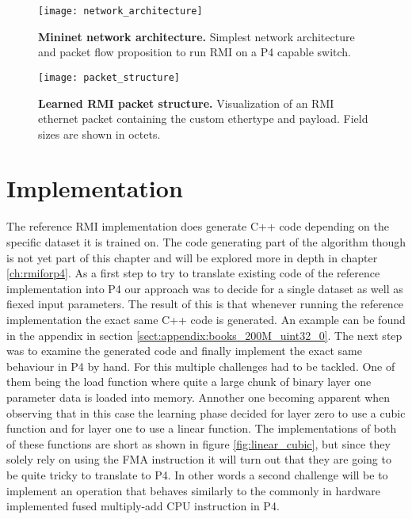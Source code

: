 \begin{figure}[!ht]
  \centering
  \texttt{[image: network\_architecture]}
  \caption[Mininet Network Architecture]{
    \textbf{Mininet network architecture.} Simplest network architecture and packet flow proposition to run RMI on a P4 capable switch.
  }
  \label{fig:network_architecture}
\end{figure}

\begin{figure}[!ht]
  \centering
  \texttt{[image: packet\_structure]}
  \caption[RMI Packet Structure]{
    \textbf{Learned RMI packet structure.} Visualization of an RMI ethernet packet containing the custom ethertype and payload. Field sizes are shown in octets.
  }
  \label{fig:packet_structure}
\end{figure}

\section{Implementation}
\label{sect:rmionbmv2:implmentation}
The reference RMI implementation \cite{cdfshop} does generate C++ code depending on the specific dataset it is trained on. The code generating part of the algorithm though is not yet part of this chapter and will be explored more in depth in chapter \ref{ch:rmiforp4}. As a first step to try to translate existing code of the reference implementation into P4 our approach was to decide for a single dataset as well as fiexed input parameters. The result of this is that whenever running the reference implementation the exact same C++ code is generated. An example can be found in the appendix in section \ref{sect:appendix:books_200M_uint32_0}. The next step was to examine the generated code and finally implement the exact same behaviour in P4 by hand. For this multiple challenges had to be tackled. One of them being the load function where quite a large chunk of binary layer one parameter data is loaded into memory. Annother one becoming apparent when observing that in this case the learning phase decided for layer zero to use a cubic function and for layer one to use a linear function. The implementations of both of these functions are short as shown in figure \ref{fig:linear_cubic}, but since they solely rely on using the FMA instruction it will turn out that they are going to be quite tricky to translate to P4. In other words a second challenge will be to implement an operation that behaves similarly to the commonly in hardware implemented fused multiply-add CPU instruction in P4.

